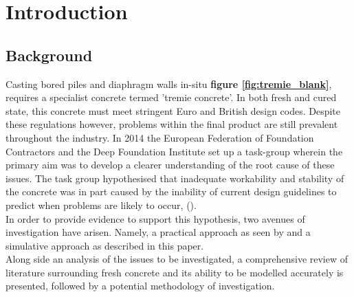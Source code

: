 
\chapter{Introduction}  %

\ifpdf
    \graphicspath{{Chapter1/Figs/Raster/}{Chapter1/Figs/PDF/}{Chapter1/Figs/}}
\else
    \graphicspath{{Chapter1/Figs/Vector/}{Chapter1/Figs/}}
\fi

\newcommand{\citetex}[1]{\citeauthor{#1} (\citeyear{#1})}
\newcommand{\citebrac}[1]{(\citeauthor{#1}, \citeyear{#1})}

\section{Background}

Casting bored piles and diaphragm walls in-situ {\bfseries figure \ref{fig:tremie_blank}}, requires a specialist concrete termed 'tremie concrete'. In both fresh and cured state, this concrete must meet stringent Euro and British design codes. Despite these regulations however, problems within the final product are still prevalent throughout the industry. In 2014 the European Federation of Foundation Contractors and the Deep Foundation Institute set up a task-group wherein the primary aim was to develop a clearer understanding of the root cause of these issues. The task group hypothesised that inadequate workability and stability of the concrete was in part caused by the inability of current design guidelines to predict when problems are likely to occur, \citetex{EFFC}.\\

\noindent
In order to provide evidence to support this hypothesis, two avenues of investigation have arisen. Namely, a practical approach as seen by \citet{bjorn}  and a simulative approach as described in this paper.\\

\noindent
Along side an analysis of the issues to be investigated, a comprehensive review of literature surrounding fresh concrete and its ability to be modelled accurately is presented, followed by a potential methodology of investigation. 

